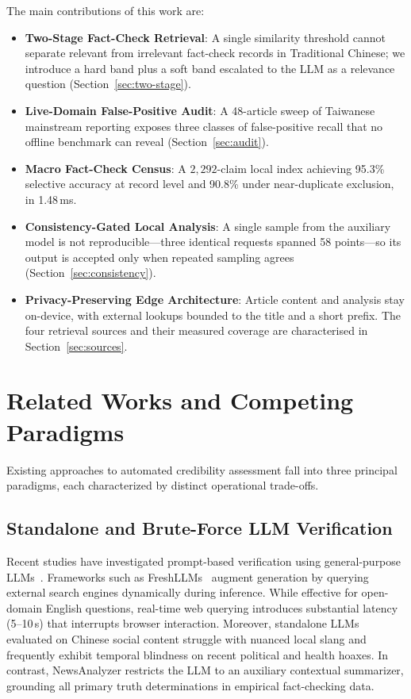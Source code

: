 \documentclass[twoside]{llncs}
\begin{document}
The main contributions of this work are:
\begin{itemize}\setlength{\itemsep}{2pt}
  \item \textbf{Two-Stage Fact-Check Retrieval}: A single similarity threshold cannot separate relevant from irrelevant fact-check records in Traditional Chinese; we introduce a hard band plus a soft band escalated to the LLM as a relevance question (Section~\ref{sec:two-stage}).
  \item \textbf{Live-Domain False-Positive Audit}: A 48-article sweep of Taiwanese mainstream reporting exposes three classes of false-positive recall that no offline benchmark can reveal (Section~\ref{sec:audit}).
  \item \textbf{Macro Fact-Check Census}: A $2{,}292$-claim local index achieving 95.3\% selective accuracy at record level and 90.8\% under near-duplicate exclusion, in 1.48\,ms.
  \item \textbf{Consistency-Gated Local Analysis}: A single sample from the auxiliary model is not reproducible---three identical requests spanned 58 points---so its output is accepted only when repeated sampling agrees (Section~\ref{sec:consistency}).
  \item \textbf{Privacy-Preserving Edge Architecture}: Article content and analysis stay on-device, with external lookups bounded to the title and a short prefix. The four retrieval sources and their measured coverage are characterised in Section~\ref{sec:sources}.
\end{itemize}

\section{Related Works and Competing Paradigms}

Existing approaches to automated credibility assessment fall into three principal paradigms, each characterized by distinct operational trade-offs.

\subsection{Standalone and Brute-Force LLM Verification}
Recent studies have investigated prompt-based verification using general-purpose LLMs~\cite{guo2022survey, chern2023factool}. Frameworks such as FreshLLMs~\cite{vu2024freshllms} augment generation by querying external search engines dynamically during inference. While effective for open-domain English questions, real-time web querying introduces substantial latency (5--10\,s) that interrupts browser interaction. Moreover, standalone LLMs evaluated on Chinese social content struggle with nuanced local slang and frequently exhibit temporal blindness on recent political and health hoaxes. In contrast, NewsAnalyzer restricts the LLM to an auxiliary contextual summarizer, grounding all primary truth determinations in empirical fact-checking data.
\end{document}
